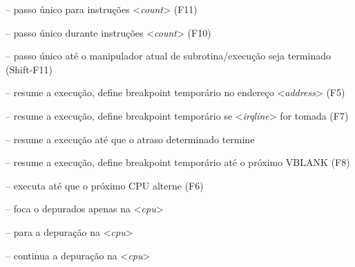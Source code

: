 \documentclass[letterpaper,10pt,brazil]{sphinxmanual}
\begin{document}
\begin{DUlineblock}{0em}
\item[] {\hyperref[debugger/execution:debugger\string-command\string-step]{}} -- passo único para instruções \textless{}\emph{count}\textgreater{} (F11)
\item[] {\hyperref[debugger/execution:debugger\string-command\string-over]{}} -- passo único durante instruções \textless{}\emph{count}\textgreater{} (F10)
\item[] {\hyperref[debugger/execution:debugger\string-command\string-out]{}} -- passo único até o manipulador atual de subrotina/execução seja terminado (Shift-F11)
\item[] {\hyperref[debugger/execution:debugger\string-command\string-go]{}} -- resume a execução, define breakpoint temporário no endereço \textless{}\emph{address}\textgreater{} (F5)
\item[] {\hyperref[debugger/execution:debugger\string-command\string-gint]{}} -- resume a execução, define breakpoint temporário se \textless{}\emph{irqline}\textgreater{} for tomada (F7)
\item[] {\hyperref[debugger/execution:debugger\string-command\string-gtime]{}} -- resume a execução até que o atraso determinado termine
\item[] {\hyperref[debugger/execution:debugger\string-command\string-gvblank]{}} -- resume a execução, define breakpoint temporário até o próximo VBLANK (F8)
\item[] {\hyperref[debugger/execution:debugger\string-command\string-next]{}} -- executa até que o próximo CPU alterne (F6)
\item[] {\hyperref[debugger/execution:debugger\string-command\string-focus]{}} -- foca o depurados apenas na \textless{}\emph{cpu}\textgreater{}
\item[] {\hyperref[debugger/execution:debugger\string-command\string-ignore]{}} -- para a depuração na \textless{}\emph{cpu}\textgreater{}
\item[] {\hyperref[debugger/execution:debugger\string-command\string-observe]{}} -- continua a depuração na \textless{}\emph{cpu}\textgreater{}

\end{DUlineblock}
\end{document}
